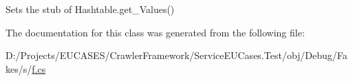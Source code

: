 Sets the stub of Hashtable.\-get\-\_\-\-Values()



The documentation for this class was generated from the following file\-:\begin{DoxyCompactItemize}
\item 
D\-:/\-Projects/\-E\-U\-C\-A\-S\-E\-S/\-Crawler\-Framework/\-Service\-E\-U\-Cases.\-Test/obj/\-Debug/\-Fakes/s/\hyperlink{s_2f_8cs}{f.\-cs}\end{DoxyCompactItemize}
